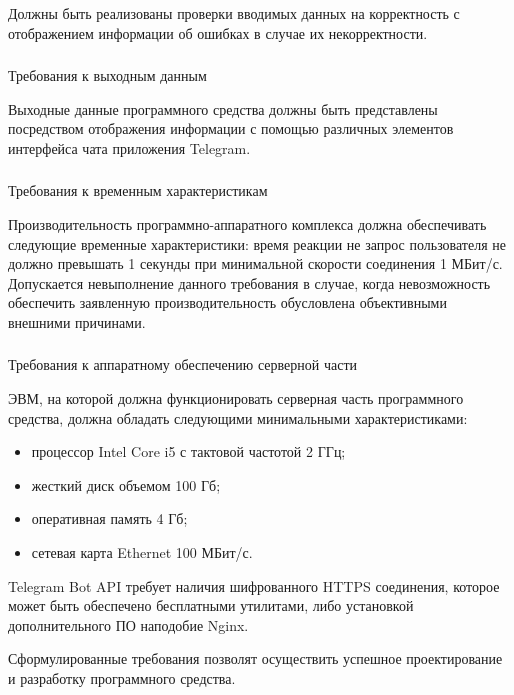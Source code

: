 Должны быть реализованы проверки вводимых данных на корректность с отображением информации об ошибках в случае их некорректности.

\subsubsection{} Требования к выходным данным
\label{sec:analysis:specification:outputs}

Выходные данные программного средства должны быть представлены посредством отображения информации с помощью различных элементов интерфейса чата приложения Telegram.

\subsubsection{} Требования к временным характеристикам
\label{sec:analysis:specification:timing}

Производительность программно-аппаратного комплекса должна обеспечивать следующие временные характеристики: время реакции не запрос пользователя не должно превышать 1 секунды при минимальной скорости соединения 1 МБит/с. Допускается невыполнение данного требования в случае, когда невозможность обеспечить заявленную производительность обусловлена объективными внешними причинами.

\subsubsection{} Требования к аппаратному обеспечению серверной части
\label{sec:analysis:specification:server_requirments}

ЭВМ, на которой должна функционировать серверная часть программного средства, должна обладать следующими минимальными характеристиками:

\begin{itemize}
	\item процессор Intel Core i5 с тактовой частотой 2 ГГц;
	\item жесткий диск объемом 100 Гб;
	\item оперативная память 4 Гб;
	\item сетевая карта Ethernet 100 МБит/с.
\end{itemize}

Telegram Bot API требует наличия шифрованного HTTPS соединения, которое может быть обеспечено бесплатными утилитами, либо установкой дополнительного ПО наподобие Nginx.

Сформулированные требования позволят осуществить успешное проектирование и разработку программного средства.
